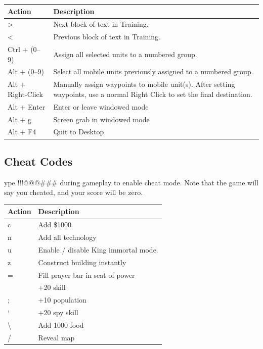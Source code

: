 \begin{center}
	\begin{tabular}{|p{1in}|p{3in}|}
		\hline	 	
		Action	& Description \\ \hline
		\textgreater & Next block of text in Training. \\ \hline
		\textless	& Previous block of text in Training. \\ \hline
		Ctrl + (0--9)	& Assign all selected units to a numbered group. \\ \hline
		Alt + (0--9)	& Select all mobile units previously assigned to a numbered group. \\ \hline
		Alt + Right-Click	& Manually assign waypoints to mobile unit(s). After setting waypoints, use a normal Right Click to set the final destination. \\ \hline
		Alt + Enter & Enter or leave windowed mode \\ \hline
		Alt + g & Screen grab in windowed mode \\ \hline
		Alt + F4	& Quit to Desktop \\ \hline
	\end{tabular}
\end{center}

\subsection{Cheat Codes}

ype !!!@@@\#\#\# during gameplay to enable cheat mode. Note that the game will say you cheated, and your score will be zero.

\begin{center}
	\begin{tabular}{|p{1in}|p{3in}|}
		\hline	 
		Action	& Description \\ \hline
		c	& Add \$1000 \\ \hline
		n	& Add all technology \\ \hline
		u	& Enable / disable King immortal mode. \\ \hline
		z	& Construct building instantly \\ \hline
		=	& Fill prayer bar in seat of power \\ \hline
		[	& +20 combat skill \\ \hline
		]	& +20 skill \\ \hline
		;	& +10 population \\ \hline
		‘	& +20 spy skill \\ \hline
		\textbackslash & Add 1000 food \\ \hline
		/	& Reveal map \\ \hline
	\end{tabular}
\end{center}